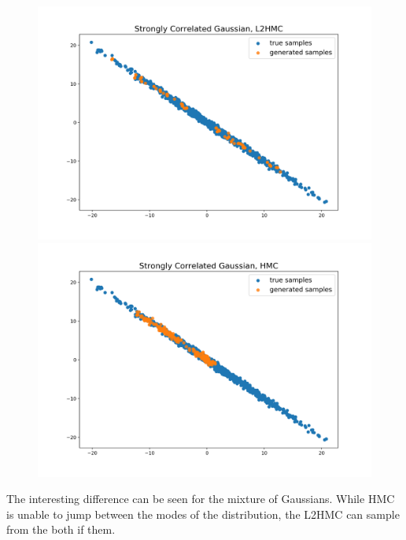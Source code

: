 \documentclass{article}
\begin{document}
\begin{figure}[H]
\centering
\begin{minipage}{.5\textwidth}
  \centering
  \includegraphics[width=\linewidth]{Strongly_Correlated_Gaussian_L2HMC.png}
\end{minipage}%
\begin{minipage}{.5\textwidth}
  \centering
  \includegraphics[width=\linewidth]{Strongly_Correlated_Gaussian_HMC.png}
\end{minipage}
\end{figure}

The interesting difference can be seen for the mixture of Gaussians. While HMC is unable to jump between the modes of the distribution, the L2HMC can sample from the both if them.
\end{document}
